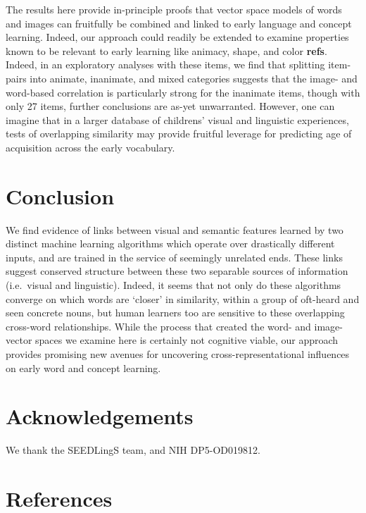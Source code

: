 \documentclass[10pt, letterpaper]{article}
\begin{document}
The results here provide in-principle proofs that vector space models of
words and images can fruitfully be combined and linked to early language
and concept learning. Indeed, our approach could readily be extended to
examine properties known to be relevant to early learning like animacy,
shape, and color \textbf{refs}. Indeed, in an exploratory analyses with
these items, we find that splitting item-pairs into animate, inanimate,
and mixed categories suggests that the image- and word-based correlation
is particularly strong for the inanimate items, though with only 27
items, further conclusions are as-yet unwarranted. However, one can
imagine that in a larger database of childrens' visual and linguistic
experiences, tests of overlapping similarity may provide fruitful
leverage for predicting age of acquisition across the early vocabulary.

\section{Conclusion}\label{conclusion}

We find evidence of links between visual and semantic features learned
by two distinct machine learning algorithms which operate over
drastically different inputs, and are trained in the service of
seemingly unrelated ends. These links suggest conserved structure
between these two separable sources of information (i.e.~visual and
linguistic). Indeed, it seems that not only do these algorithms converge
on which words are `closer' in similarity, within a group of oft-heard
and seen concrete nouns, but human learners too are sensitive to these
overlapping cross-word relationships. While the process that created the
word- and image-vector spaces we examine here is certainly not cognitive
viable, our approach provides promising new avenues for uncovering
cross-representational influences on early word and concept learning.

\section{Acknowledgements}\label{acknowledgements}

We thank the SEEDLingS team, and NIH DP5-OD019812.

\section{References}\label{references}

\setlength{\parindent}{-0.1in} \setlength{\leftskip}{0.125in} \noindent
\end{document}

